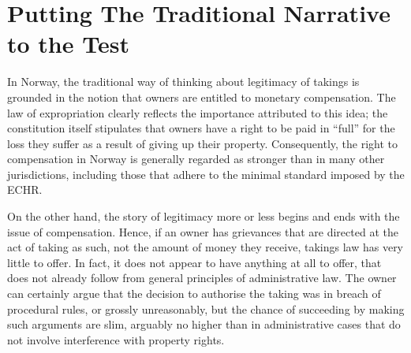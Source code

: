 \documentclass{article} %
\newcommand{\noo}[1]{}
\begin{document}
\noo{
analysis, which must by necessity 

link the idea of the democratic deficit with theoretical work. on the category of economic development takings. In particular, I explore the notion of participation, to  and arguing that it is key to understanding common discontents that arise in for-profit taking situations. 

, by arguing that the recognition of this as a special category is closely related to a shift of focus towards procedural legitimacy. 

Building on this perspective, 

  that legal scholars and policy makers should address more actively.




I believe this suggestion is 


I go on to consider the hypothesis that economic development takings demonstrate that takings law suffer from a {\it democratic deficit}.}

\section{Putting The Traditional Narrative to the Test}

In Norway, the traditional way of thinking about legitimacy of takings is grounded in the notion that owners are entitled to monetary compensation. The law of expropriation clearly reflects the importance attributed to this idea; the constitution itself stipulates that owners have a right to be paid in ``full'' for the loss they suffer as a result of giving up their property. Consequently, the right to compensation in Norway is generally regarded as stronger than in many other jurisdictions, including those that adhere to the minimal standard imposed by the ECHR.

On the other hand, the story of legitimacy more or less begins and ends with the issue of compensation. Hence, if an owner has grievances that are directed at the act of taking as such, not the amount of money they receive, takings law has very little to offer. In fact, it does not appear to have anything at all to offer, that does not already follow from general principles of administrative law. The owner can certainly argue that the decision to authorise the taking was in breach of procedural rules, or grossly unreasonably, but the chance of succeeding by making such arguments are slim, arguably no higher than in administrative cases that do not involve interference with property rights.
\end{document}
